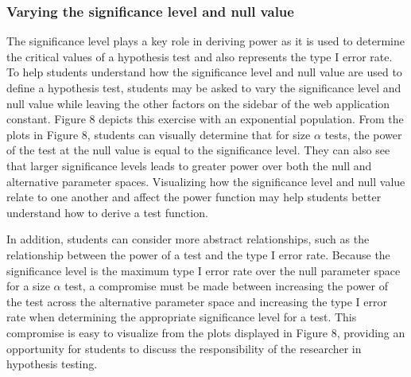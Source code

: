 \documentclass{TISE}
\begin{document}
\subsubsection{Varying the significance level and null value}

The significance level plays a key role in deriving power as it is used to determine the critical values of a hypothesis test and also represents the type I error rate. To help students understand how the significance level and null value are used to define a hypothesis test, students may be asked to vary the significance level and null value while leaving the other factors on the sidebar of the web application constant. Figure 8 depicts this exercise with an exponential population. From the plots in Figure 8, students can visually determine that for size $\alpha$ tests, the power of the test at the null value is equal to the significance level. They can also see that larger significance levels leads to greater power over both the null and alternative parameter spaces. Visualizing how the significance level and null value relate to one another and affect the power function may help students better understand how to derive a test function. 

In addition, students can consider more abstract relationships, such as the relationship between the power of a test and the type I error rate. Because the significance level is the maximum type I error rate over the null parameter space for a size $\alpha$ test, a compromise must be made between increasing the power of the test across the alternative parameter space and increasing the type I error rate when determining the appropriate significance level for a test. This compromise is easy to visualize from the plots displayed in Figure 8, providing an opportunity for students to discuss the responsibility of the researcher in hypothesis testing.

\newpage
\end{document}
